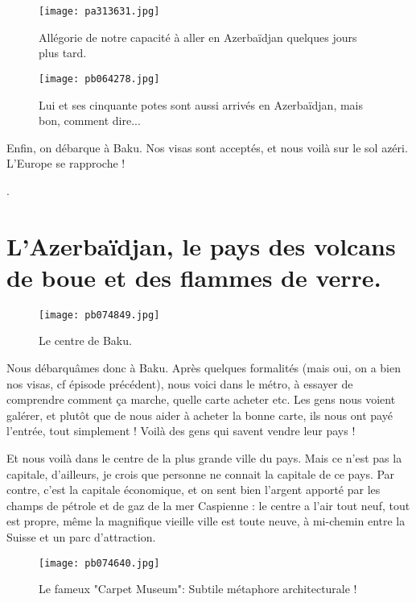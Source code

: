 \documentclass{book}
\begin{document}
\begin{figure}[h]
\centering
\texttt{[image: pa313631.jpg]}
\caption*{Allégorie de notre capacité à aller en Azerbaïdjan quelques jours plus tard.}
\end{figure}


\begin{figure}[h]
\centering
\texttt{[image: pb064278.jpg]}
\caption*{Lui et ses cinquante potes sont aussi arrivés en Azerbaïdjan, mais bon, comment dire...}
\end{figure}

Enfin, on débarque à Baku. Nos visas sont acceptés, et nous voilà sur le sol azéri. L'Europe se rapproche !

.



\chapter{L'Azerbaïdjan, le pays des volcans de boue et des flammes de verre.}


\begin{wrapfigure}{l}{0.55\textwidth}
\centering
\texttt{[image: pb074849.jpg]}
\caption*{Le centre de Baku.}
\end{wrapfigure}

Nous débarquâmes donc à Baku. Après quelques formalités (mais oui, on a bien nos visas, cf épisode précédent), nous voici dans le métro, à essayer de comprendre comment ça marche, quelle carte acheter etc. Les gens nous voient galérer, et plutôt que de nous aider à acheter la bonne carte, ils nous ont payé l'entrée, tout simplement ! Voilà des gens qui savent vendre leur pays !


Et nous voilà dans le centre de la plus grande ville du pays. Mais ce n'est pas la capitale, d'ailleurs, je crois que personne ne connait la capitale de ce pays. Par contre, c'est la capitale économique, et on sent bien l'argent apporté par les champs de pétrole et de gaz de la mer Caspienne : le centre a l'air tout neuf, tout est propre, même la magnifique vieille ville est toute neuve, à mi-chemin entre la Suisse et un parc d'attraction.


\begin{figure}[h]
\centering
\texttt{[image: pb074640.jpg]}
\caption*{Le fameux "Carpet Museum": Subtile métaphore architecturale !}
\end{figure}
\end{document}
